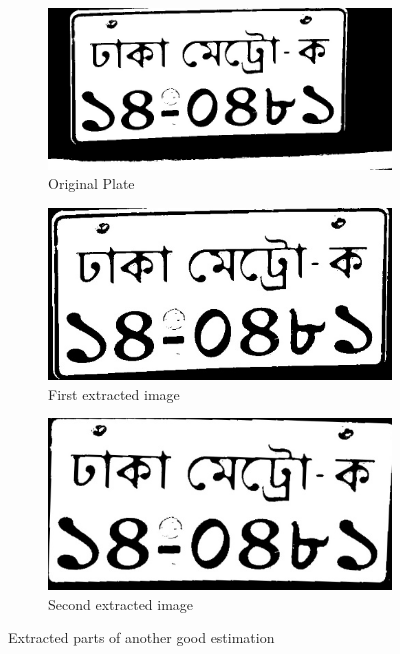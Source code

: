 \begin{figure}
\begin{subfigure}{\textwidth}
    \centering
    \includegraphics[width=0.5\linewidth]{./img/experiment/stage.10/00-good3}
    \caption{Original Plate}
\end{subfigure}
\begin{subfigure}{0.5\textwidth}
    \centering
    \includegraphics[width=0.9\linewidth]{./img/experiment/stage.13/00-00-good3}
    \caption{First extracted image}    
\end{subfigure}
\begin{subfigure}{0.5\textwidth}
    \centering
    \includegraphics[width=0.9\linewidth]{./img/experiment/stage.13/01-00-good3}
    \caption{Second extracted image}
\end{subfigure}
\caption{Extracted parts of another good estimation}
\label{fig:ExtractedResult2}
\end{figure}


